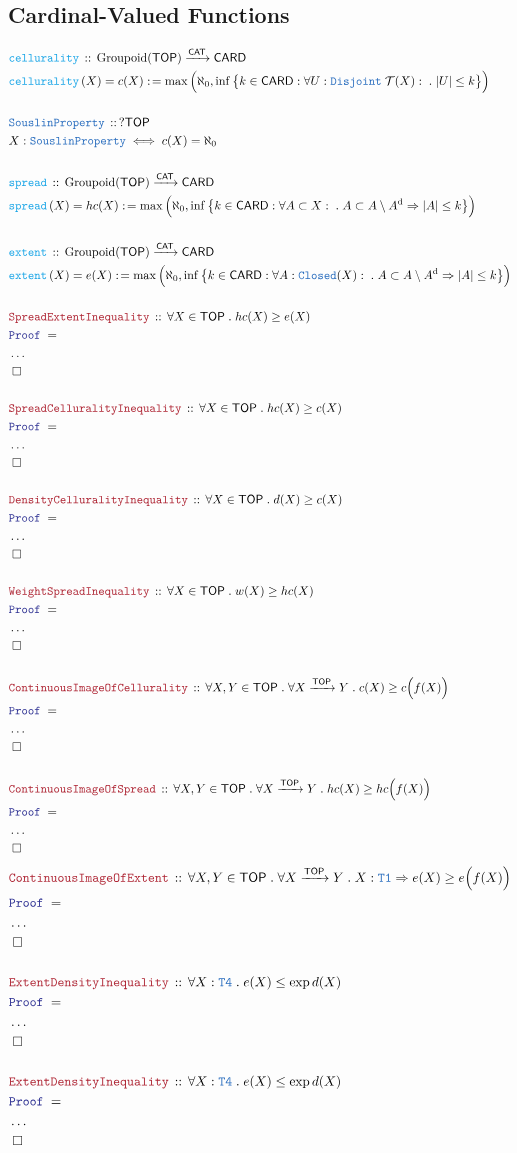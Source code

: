 \documentclass[12pt]{scrartcl}
\newcommand{\TYPE}[1]{\textcolor{NavyBlue}{\mathtt{#1}}}
\newcommand{\FUNC}[1]{\textcolor{Cerulean}{\mathtt{#1}}}
\newcommand{\LOGIC}[1]{\textcolor{Blue}{\mathtt{#1}}}
\newcommand{\THM}[1]{\textcolor{Maroon}{\mathtt{#1}}}
\renewcommand{\.}{\; . \;}
\newcommand{\de}{: \kern 0.1pc =}
\newcommand{\Act}[1]{\left( #1 \right)}
\newcommand{\Theorem}[2]{& \THM{#1} \, :: \, #2 \\ & \Proof = \\ }
\newcommand{\DeclareType}[2]{& \TYPE{#1} \, :: \, #2 \\}
\newcommand{\DefineType}[3]{& #1 : \TYPE{#2} \iff #3 \\}
\newcommand{\DeclareFunc}[2]{& \FUNC{#1} \, :: \, #2 \\}
\newcommand{\DefineNamedFunc}[4]{&  \FUNC{#1}\Act{#2} = #3 \de #4 \\}
\newcommand{\Page}[1]{ \begin{align*} #1 \end{align*}   }
\newcommand{\NoProof}{ & \ldots \\ \EndProof}
\newcommand{\Imply}{\Rightarrow}
\newcommand{\Arrow}{\xrightarrow}
\newcommand{\QED}{\; \square}
\newcommand{\EndProof}{& \QED \\}
\newcommand{\Proof}{\LOGIC{Proof} \; }
\newcommand{\CAT}{\mathsf{CAT}}
\newcommand{\TOP}{\mathsf{TOP}}
\newcommand{\T}{\mathcal{T}}
\renewcommand{\d}{\mathrm{d}}
\begin{document}
\subsection{Cardinal-Valued Functions}
\Page{
	\DeclareFunc{cellurality}
	{
		\mathrm{Groupoid}(\TOP) \Arrow{\CAT} \mathsf{CARD}
	}
	\DefineNamedFunc{cellurality}{X}{c(X)}
	{
		\max \Big( \aleph_0, \inf \big\{ k \in \mathsf{CARD} : 
			\forall U : \TYPE{Disjoint} \; \T(X) : \. |U| \le k  \big\} \Big)
	}
	\\
	\DeclareType{SouslinProperty}{?\TOP}
	\DefineType{X}{SouslinProperty}{c(X) = \aleph_0}
	\\
	\DeclareFunc{spread}
	{
		\mathrm{Groupoid}(\TOP) \Arrow{\CAT} \mathsf{CARD}
	}
	\DefineNamedFunc{spread}{X}{hc(X)}
	{
		\max \Big( \aleph_0, \inf \big\{ k \in \mathsf{CARD} : 
			\forall A \subset X : \. A \subset A \setminus A^\d \Imply |A| \le k  \big\} \Big)
	}
	\\
	\DeclareFunc{extent}
	{
		\mathrm{Groupoid}(\TOP) \Arrow{\CAT} \mathsf{CARD}
	}
	\DefineNamedFunc{extent}{X}{e(X)}
	{
		\max \Big( \aleph_0, \inf \big\{ k \in \mathsf{CARD} : 
			\forall A : \TYPE{Closed}(X) : \. A \subset A \setminus A^\d \Imply |A| \le k  \big\} \Big)
	}
	\\
	\Theorem{SpreadExtentInequality}
	{
		\forall X \in \TOP \. hc(X) \ge e(X)
	}
	\NoProof
	\\
	\Theorem{SpreadCelluralityInequality}{ 
		\forall X \in \TOP \.
		hc(X) \ge c(X)
	}
	\NoProof
	\\
	\Theorem{DensityCelluralityInequality}
	{
		\forall X \in \TOP \.
		d(X) \ge c(X)
	}
	\NoProof
	\\
	\Theorem{WeightSpreadInequality}
	{
		\forall X \in \TOP \.
		w(X) \ge hc(X) 
	}
	\NoProof
	\\
	\Theorem{ContinuousImageOfCellurality}
	{
		\forall X,Y \in \TOP \.
		\forall X \Arrow{\TOP} Y \.
		c(X) \ge c\Big( f(X) \Big)
	}
	\NoProof
	\\
	\Theorem{ContinuousImageOfSpread}
	{
		\forall X,Y \in \TOP \.
		\forall X \Arrow{\TOP} Y \.
		hc(X) \ge hc\Big( f(X) \Big)
	}
	\NoProof
}\Page{
	\Theorem{ContinuousImageOfExtent}
	{
		\forall X,Y \in \TOP \.
		\forall X \Arrow{\TOP} Y \.
		X : \TYPE{T1} \Imply
		e(X) \ge e\Big( f(X) \Big)
	}
	\NoProof
	\\
	\Theorem{ExtentDensityInequality}
	{
		\forall X : \TYPE{T4} \.
		e(X) \le \exp d(X) 
	}
	\NoProof
	\\
	\Theorem{ExtentDensityInequality}
	{
		\forall X : \TYPE{T4} \.
		e(X) \le \exp d(X) 
	}
	\NoProof
	\\
}
\end{document}

